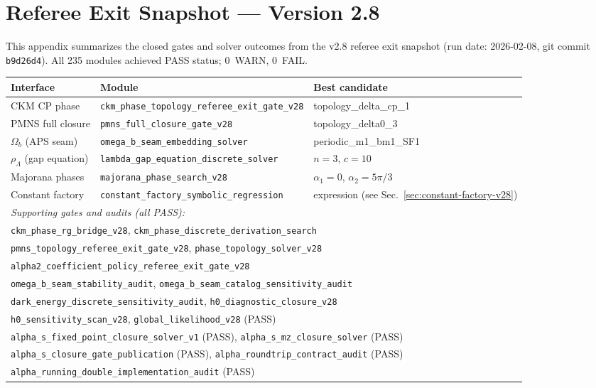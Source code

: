 \section{Referee Exit Snapshot --- Version 2.8}
\label{app:referee-exit-v28}

This appendix summarizes the closed gates and solver outcomes from the v2.8 referee exit snapshot (run date: 2026-02-08, git commit \texttt{b9d26d4}). All 235 modules achieved PASS status; 0~WARN, 0~FAIL.

\begin{center}
\renewcommand{\arraystretch}{1.2}
\begin{tabular}{@{}p{4.5cm}p{5.5cm}p{3cm}@{}}
\toprule
\textbf{Interface} & \textbf{Module} & \textbf{Best candidate}\\
\midrule
CKM CP phase & \texttt{ckm\_phase\_topology\_referee\_exit\_gate\_v28} & topology\_delta\_cp\_1\\
PMNS full closure & \texttt{pmns\_full\_closure\_gate\_v28} & topology\_delta0\_3\\
$\Omega_b$ (APS seam) & \texttt{omega\_b\_seam\_embedding\_solver} & periodic\_m1\_bm1\_SF1\\
$\rho_\Lambda$ (gap equation) & \texttt{lambda\_gap\_equation\_discrete\_solver} & $n=3$, $c=10$\\
Majorana phases & \texttt{majorana\_phase\_search\_v28} & $\alpha_1=0$, $\alpha_2=5\pi/3$\\
Constant factory & \texttt{constant\_factory\_symbolic\_regression} & expression (see Sec.~\ref{sec:constant-factory-v28})\\
\midrule
\multicolumn{3}{l}{\textit{Supporting gates and audits (all PASS):}}\\
\multicolumn{3}{l}{\texttt{ckm\_phase\_rg\_bridge\_v28}, \texttt{ckm\_phase\_discrete\_derivation\_search}}\\
\multicolumn{3}{l}{\texttt{pmns\_topology\_referee\_exit\_gate\_v28}, \texttt{phase\_topology\_solver\_v28}}\\
\multicolumn{3}{l}{\texttt{alpha2\_coefficient\_policy\_referee\_exit\_gate\_v28}}\\
\multicolumn{3}{l}{\texttt{omega\_b\_seam\_stability\_audit}, \texttt{omega\_b\_seam\_catalog\_sensitivity\_audit}}\\
\multicolumn{3}{l}{\texttt{dark\_energy\_discrete\_sensitivity\_audit}, \texttt{h0\_diagnostic\_closure\_v28}}\\
\multicolumn{3}{l}{\texttt{h0\_sensitivity\_scan\_v28}, \texttt{global\_likelihood\_v28} (PASS)}\\
\multicolumn{3}{l}{\texttt{alpha\_s\_fixed\_point\_closure\_solver\_v1} (PASS), \texttt{alpha\_s\_mz\_closure\_solver} (PASS)}\\
\multicolumn{3}{l}{\texttt{alpha\_s\_closure\_gate\_publication} (PASS), \texttt{alpha\_roundtrip\_contract\_audit} (PASS)}\\
\multicolumn{3}{l}{\texttt{alpha\_running\_double\_implementation\_audit} (PASS)}\\
\bottomrule
\end{tabular}
\end{center}

